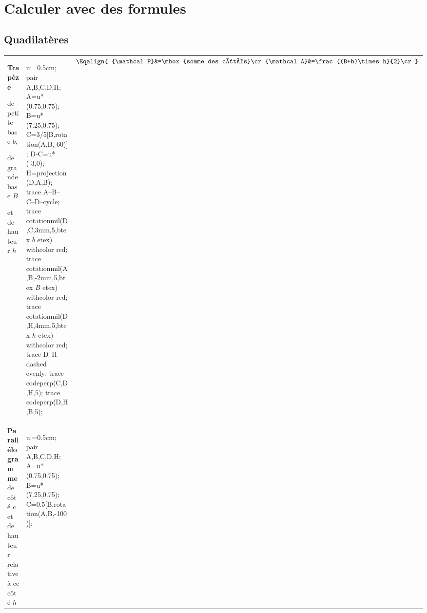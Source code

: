 \section{Calculer avec des formules}
\subsection{Quadilatères}
{\renewcommand{\arraystretch}{1}
    \begin{center}
        \begin{longtable}{|>{\centering\arraybackslash}m{}|>{\centering\arraybackslash}m{}|>{\centering\arraybackslash}m{}|}    
            \hline
            \multicolumn{1}{|c|}{\bf Figure}&\multicolumn{1}{c|}{\bf Représentation}&\multicolumn{1}{c|}{\bf P\'erimètre et aire}\\
            \hline
            \textbf{ Trapèze} \par de petite base $b$,\par  de grande base $B$\par et de hauteur $h$
            &
            \rule[-0.5cm]{0pt}{3.2cm}            
            \begin{Geometrie}[CoinBG={(0,-.5u)},CoinHD={(8u,6.5u)}]    
                u:=0.5cm;
                pair A,B,C,D,H;
                A=u*(0.75,0.75);
                B=u*(7.25,0.75);
                C=3/5[B,rotation(A,B,-60)];
                D-C=u*(-3,0);
                H=projection(D,A,B);
                trace A--B--C--D--cycle;
                trace cotationmil(D,C,3mm,5,btex $b$ etex) withcolor red;
                trace cotationmil(A,B,-2mm,5,btex $B$ etex) withcolor red;
                trace cotationmil(D,H,4mm,5,btex $h$ etex) withcolor red;
                trace D--H dashed evenly;
                trace codeperp(C,D,H,5);
                trace codeperp(D,H,B,5);
            \end{Geometrie}
            &
            $\Eqalign{
            {\mathcal P}&=\mbox{somme des côtés}\cr
            {\mathcal A}&=\frac{(B+b)\times h}{2}\cr
            }$\\\hline
            \textbf{ Parallélogramme} de côté $c$ et de hauteur relative à ce côté $h$
            &
            \rule[-0.5cm]{0pt}{3.2cm}            
            \begin{Geometrie}[CoinBG={(0,-.5u)},CoinHD={(5u,4.5u)}]    
                u:=0.5cm;                
                pair A,B,C,D,H;
                A=u*(0.75,0.75);
                B=u*(7.25,0.75);
                C=0.5[B,rotation(A,B,-100)];

\end{Geometrie}
\end{longtable}
\end{center}}
